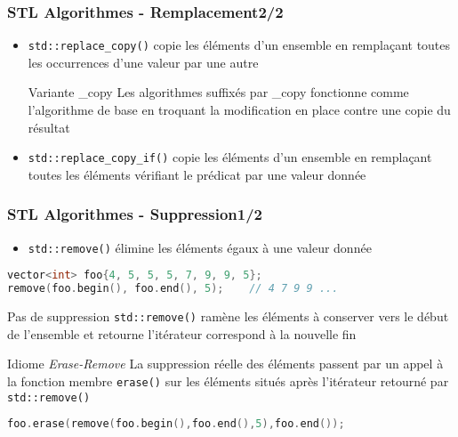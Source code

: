 \documentclass[C++.tex]{subfiles}
\begin{document}
\begin{frame}[fragile]
	\frametitle{STL Algorithmes - Remplacement\titlehfill{}2/2}
	\begin{itemize}
		\item \lstinline|std::replace_copy()| copie les éléments d'un ensemble en remplaçant toutes les occurrences d'une valeur par une autre
		\begin{block}{Variante \og \_copy\fg{}}
			Les algorithmes suffixés par \_copy fonctionne comme l'algorithme de base en troquant la modification en place contre une copie du résultat
		\end{block}
		\item \lstinline|std::replace_copy_if()| copie les éléments d'un ensemble en remplaçant toutes les éléments vérifiant le prédicat par une valeur donnée
	\end{itemize}
\end{frame}

\begin{frame}[fragile]
	\frametitle{STL Algorithmes - Suppression\titlehfill{}1/2}
	\begin{itemize}
		\item \lstinline|std::remove()| \og élimine\fg{} les éléments égaux à une valeur donnée
	\end{itemize}

	\begin{lstlisting}[language=C++]
vector<int> foo{4, 5, 5, 5, 7, 9, 9, 5};
remove(foo.begin(), foo.end(), 5);    // 4 7 9 9 ...\end{lstlisting}


	\pause

	\begin{alertblock}{Pas de suppression}
		\lstinline|std::remove()| ramène les éléments à conserver vers le début de l'ensemble et retourne l'itérateur correspond à la nouvelle fin
	\end{alertblock}


	\pause

	\begin{block}{Idiome \textit{Erase-Remove}}
		La suppression réelle des éléments passent par un appel à la fonction membre \lstinline|erase()| sur les éléments situés après l'itérateur retourné par \lstinline|std::remove()|
	
		\begin{lstlisting}[language=C++]
foo.erase(remove(foo.begin(),foo.end(),5),foo.end());\end{lstlisting}
	\end{block}
\end{frame}
\end{document}
